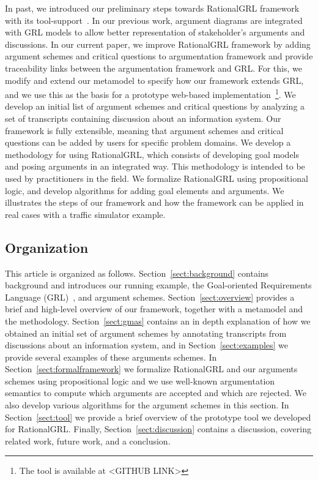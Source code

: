 In past, we introduced our preliminary steps towards RationalGRL framework~\cite{bnaic2014,vanzee-etal:renext2015,vanZee-etal:er2016} with its tool-support~\cite{vanZee-etal:comma2016}.  In our previous work, argument diagrams are integrated with GRL models to allow better representation of stakeholder's arguments and discussions. In our current paper, we improve RationalGRL framework by adding argument schemes and critical questions to argumentation framework and provide traceability links between the argumentation framework and GRL.  For this, we modify and extend our metamodel to specify how our framework extends GRL, and we use this as the basis for a prototype web-based implementation~\footnote{The tool is available at <GITHUB LINK>}. %
We develop an initial list of argument schemes and critical questions by analyzing a set of transcripts containing discussion about an information system. Our framework is fully extensible, meaning that argument schemes and critical questions can be added by users for specific problem domains. We develop a methodology for using RationalGRL, which consists of developing goal models and posing arguments in an integrated way. This methodology is intended to be used by practitioners in the field. We formalize RationalGRL using propositional logic, and develop algorithms for adding goal elements and arguments. We illustrates the steps of our framework  and how the framework can be applied in real cases with a traffic simulator example.

\subsection{Organization} %

This article is organized as follows. Section~\ref{sect:background} contains background and introduces our running example, the Goal-oriented Requirements Language (GRL)~\cite{Amyot:2010:EGM:1841349.1841356}, and argument schemes. Section~\ref{sect:overview} provides a brief and high-level overview of our framework, together with a metamodel and the methodology. Section~\ref{sect:gmas} contains an in depth explanation of how we obtained an initial set of argument schemes by annotating transcripts from discussions about an information system, and in Section~\ref{sect:examples} we provide several examples of these arguments schemes. In Section~\ref{sect:formalframework} we formalize RationalGRL and our arguments schemes using propositional logic and we use well-known argumentation semantics to compute which arguments are accepted and which are rejected. We also develop various algorithms for the argument schemes in this section. In Section~\ref{sect:tool} we provide a brief overview of the prototype tool we developed for RationalGRL. Finally, Section~\ref{sect:discussion} contains a discussion, covering related work, future work, and a conclusion.